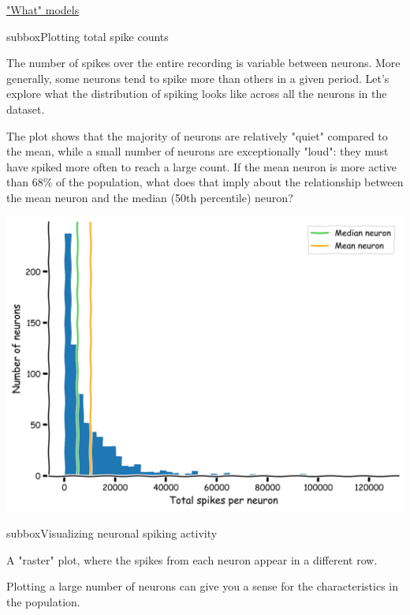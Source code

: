 \begin{textbox}{\href{https://compneuro.neuromatch.io/tutorials/W1D1_ModelTypes/student/W1D1_Tutorial1.html}{"What" models } }
\begin{subbox}{subbox}{Plotting total spike counts}
\scriptsize

The number of spikes over the entire recording is variable between neurons. More generally, some neurons tend to spike more than others in a given period. Let's explore what the distribution of spiking looks like across all the neurons in the dataset.

The plot shows that the majority of neurons are relatively "quiet" compared to the mean, while a small number of neurons are exceptionally "loud": they must have spiked more often to reach a large count.
If the mean neuron is more active than 68\% of the population, what does that imply about the relationship between the mean neuron and the median (50th percentile) neuron?

\centering
\includegraphics[scale=0.11]{Figures/MT/MT_Figure1.png}
\end{subbox}


\begin{subbox}{subbox}{Visualizing neuronal spiking activity}
\scriptsize

A "raster" plot, where the spikes from each neuron appear in a different row.

Plotting a large number of neurons can give you a sense for the characteristics in the population. 


\end{subbox}
\end{textbox}
